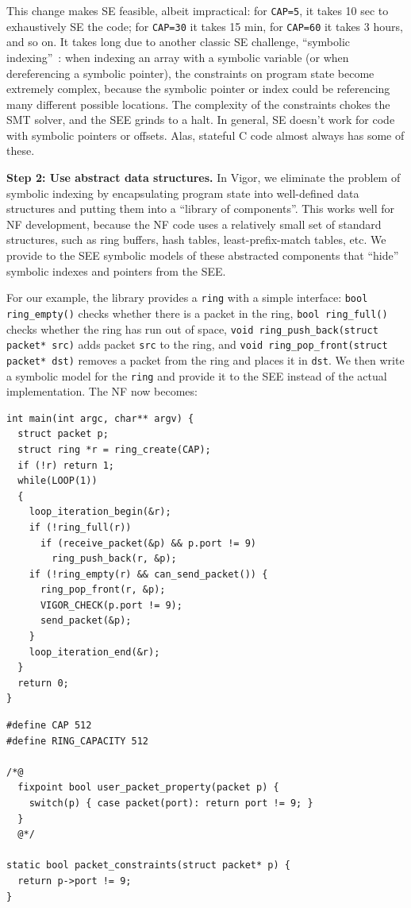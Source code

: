 \documentclass[letterpaper,twocolumn,10pt]{article}
\newcommand{\code}[1]{\lstinline{#1}}
\begin{document}
This change makes SE feasible, albeit impractical: for \code{CAP=5}, it takes 10 sec to exhaustively SE the code; for \code{CAP=30} it takes 15 min, for \code{CAP=60} it takes 3 hours, and so on. It takes long due to another classic SE challenge, ``symbolic indexing''~\cite{sen2005cute,godefroid2008automated,boonstoppel2008rwset}: when indexing an array with a symbolic variable (or when dereferencing a symbolic pointer), the constraints on program state become extremely complex, because the symbolic pointer or index could be referencing many different possible locations. The complexity of the constraints chokes the SMT solver, and the SEE grinds to a halt. In general, SE doesn't work for code with symbolic pointers or offsets. Alas, stateful C code almost always has some of these.

{\bf Step 2: Use abstract data structures.} In Vigor, we eliminate the problem of symbolic indexing by encapsulating program state into well-defined data structures and putting them into a ``library of components''. This works well for NF development, because the NF code uses a relatively small set of standard structures, such as ring buffers, hash tables, least-prefix-match tables, etc. We provide to the SEE symbolic models of these abstracted components that ``hide'' symbolic indexes and pointers from the SEE.

For our example, the library provides a \code{ring} with a simple interface: \code{bool ring_empty()} checks whether there is a packet in the ring, \code{bool ring_full()} checks whether the ring has run out of space, \code{void ring_push_back(struct packet* src)} adds packet \code{src} to the ring, and \code{void ring_pop_front(struct packet* dst)} removes a packet from the ring and places it in \code{dst}. We then write a symbolic model for the \code{ring} and provide it to the SEE instead of the actual implementation. The NF now becomes:

\begin{lstlisting}
int main(int argc, char** argv) {
  struct packet p;
  struct ring *r = ring_create(CAP);
  if (!r) return 1;
  while(LOOP(1))
  {
    loop_iteration_begin(&r);
    if (!ring_full(r))
      if (receive_packet(&p) && p.port != 9)
        ring_push_back(r, &p);
    if (!ring_empty(r) && can_send_packet()) {
      ring_pop_front(r, &p);
      VIGOR_CHECK(p.port != 9);
      send_packet(&p);
    }
    loop_iteration_end(&r);
  }
  return 0;
}
\end{lstlisting}

\begin{lstlisting}
#define CAP 512
#define RING_CAPACITY 512

/*@
  fixpoint bool user_packet_property(packet p) {
    switch(p) { case packet(port): return port != 9; }
  }
  @*/

static bool packet_constraints(struct packet* p) {
  return p->port != 9;
}
\end{lstlisting}
\end{document}
